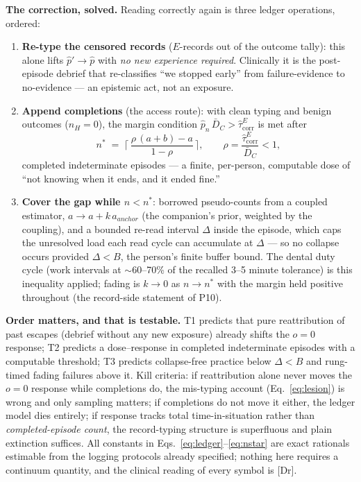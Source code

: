 \documentclass[9pt,twocolumn]{article}
\newcommand{\tcorr}{\widehat{\tau}^{E}_{\mathrm{corr}}}
\newcommand{\tier}[1]{{\sffamily\scriptsize\color{RRHMSlate}[#1]}}
\begin{document}
\textbf{The correction, solved.} Reading correctly again is three ledger operations, ordered:
\begin{enumerate}[leftmargin=1.7em]
\item[T1] \textbf{Re-type the censored records} ($E$-records out of the outcome tally): this alone lifts $\hat p'\to\hat p$ with \emph{no new experience required}. Clinically it is the post-episode debrief that re-classifies ``we stopped early'' from failure-evidence to no-evidence --- an epistemic act, not an exposure.
\item[T2] \textbf{Append completions} (the access route): with clean typing and benign outcomes ($n_H{=}0$), the margin condition $\hat p_n\,\bar D_C>\tcorr$ is met after
\begin{equation}
n^{*}\;=\;\Big\lceil\,\frac{\rho\,(a+b)-a}{1-\rho}\,\Big\rceil,\qquad \rho=\frac{\tcorr}{\bar D_C}<1,
\label{eq:nstar}
\end{equation}
completed indeterminate episodes --- a finite, per-person, computable dose of ``not knowing when it ends, and it ended fine.''
\item[T3] \textbf{Cover the gap while $n<n^{*}$}: borrowed pseudo-counts from a coupled estimator, $a\to a+k\,a_{anchor}$ (the companion's prior, weighted by the coupling), and a bounded re-read interval $\Delta$ inside the episode, which caps the unresolved load each read cycle can accumulate at $\Delta$ --- so no collapse occurs provided $\Delta<B$, the person's finite buffer bound. The dental duty cycle (work intervals at $\sim$60--70\% of the recalled 3--5 minute tolerance) is this inequality applied; fading is $k\to0$ as $n\to n^{*}$ with the margin held positive throughout (the record-side statement of P10).
\end{enumerate}

\textbf{Order matters, and that is testable.} T1 predicts that pure reattribution of past escapes (debrief without any new exposure) already shifts the $o{=}0$ response; T2 predicts a dose--response in completed indeterminate episodes with a computable threshold; T3 predicts collapse-free practice below $\Delta<B$ and rung-timed fading failures above it. Kill criteria: if reattribution alone never moves the $o{=}0$ response while completions do, the mis-typing account (Eq.~\ref{eq:lesion}) is wrong and only sampling matters; if completions do not move it either, the ledger model dies entirely; if response tracks total time-in-situation rather than \emph{completed-episode count}, the record-typing structure is superfluous and plain extinction suffices. All constants in Eqs.~\ref{eq:ledger}--\ref{eq:nstar} are exact rationals estimable from the logging protocols already specified; nothing here requires a continuum quantity, and the clinical reading of every symbol is \tier{Dr}.
\end{document}
